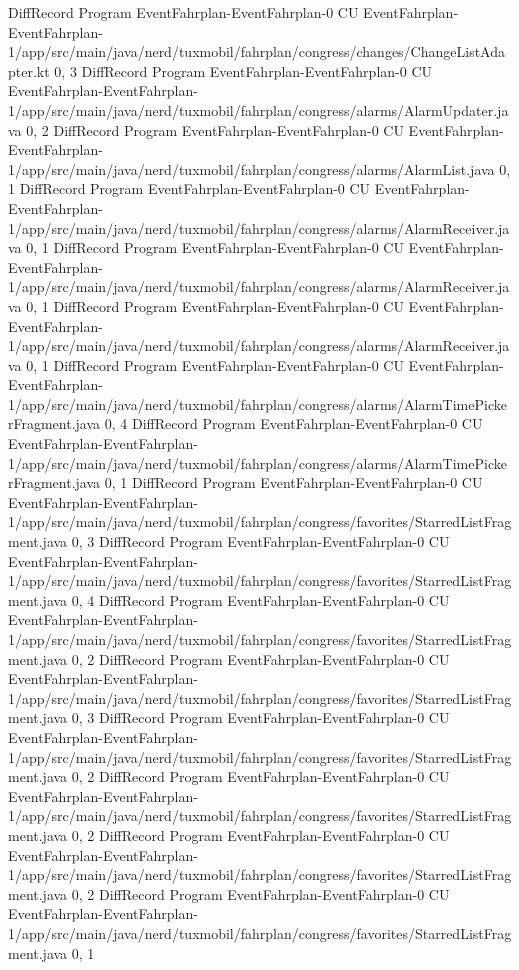 DiffRecord Program EventFahrplan-EventFahrplan-0 CU EventFahrplan-EventFahrplan-1/app/src/main/java/nerd/tuxmobil/fahrplan/congress/changes/ChangeListAdapter.kt  {0, 3}
DiffRecord Program EventFahrplan-EventFahrplan-0 CU EventFahrplan-EventFahrplan-1/app/src/main/java/nerd/tuxmobil/fahrplan/congress/alarms/AlarmUpdater.java  {0, 2}
DiffRecord Program EventFahrplan-EventFahrplan-0 CU EventFahrplan-EventFahrplan-1/app/src/main/java/nerd/tuxmobil/fahrplan/congress/alarms/AlarmList.java  {0, 1}
DiffRecord Program EventFahrplan-EventFahrplan-0 CU EventFahrplan-EventFahrplan-1/app/src/main/java/nerd/tuxmobil/fahrplan/congress/alarms/AlarmReceiver.java  {0, 1}
DiffRecord Program EventFahrplan-EventFahrplan-0 CU EventFahrplan-EventFahrplan-1/app/src/main/java/nerd/tuxmobil/fahrplan/congress/alarms/AlarmReceiver.java  {0, 1}
DiffRecord Program EventFahrplan-EventFahrplan-0 CU EventFahrplan-EventFahrplan-1/app/src/main/java/nerd/tuxmobil/fahrplan/congress/alarms/AlarmReceiver.java  {0, 1}
DiffRecord Program EventFahrplan-EventFahrplan-0 CU EventFahrplan-EventFahrplan-1/app/src/main/java/nerd/tuxmobil/fahrplan/congress/alarms/AlarmTimePickerFragment.java  {0, 4}
DiffRecord Program EventFahrplan-EventFahrplan-0 CU EventFahrplan-EventFahrplan-1/app/src/main/java/nerd/tuxmobil/fahrplan/congress/alarms/AlarmTimePickerFragment.java  {0, 1}
DiffRecord Program EventFahrplan-EventFahrplan-0 CU EventFahrplan-EventFahrplan-1/app/src/main/java/nerd/tuxmobil/fahrplan/congress/favorites/StarredListFragment.java  {0, 3}
DiffRecord Program EventFahrplan-EventFahrplan-0 CU EventFahrplan-EventFahrplan-1/app/src/main/java/nerd/tuxmobil/fahrplan/congress/favorites/StarredListFragment.java  {0, 4}
DiffRecord Program EventFahrplan-EventFahrplan-0 CU EventFahrplan-EventFahrplan-1/app/src/main/java/nerd/tuxmobil/fahrplan/congress/favorites/StarredListFragment.java  {0, 2}
DiffRecord Program EventFahrplan-EventFahrplan-0 CU EventFahrplan-EventFahrplan-1/app/src/main/java/nerd/tuxmobil/fahrplan/congress/favorites/StarredListFragment.java  {0, 3}
DiffRecord Program EventFahrplan-EventFahrplan-0 CU EventFahrplan-EventFahrplan-1/app/src/main/java/nerd/tuxmobil/fahrplan/congress/favorites/StarredListFragment.java  {0, 2}
DiffRecord Program EventFahrplan-EventFahrplan-0 CU EventFahrplan-EventFahrplan-1/app/src/main/java/nerd/tuxmobil/fahrplan/congress/favorites/StarredListFragment.java  {0, 2}
DiffRecord Program EventFahrplan-EventFahrplan-0 CU EventFahrplan-EventFahrplan-1/app/src/main/java/nerd/tuxmobil/fahrplan/congress/favorites/StarredListFragment.java  {0, 2}
DiffRecord Program EventFahrplan-EventFahrplan-0 CU EventFahrplan-EventFahrplan-1/app/src/main/java/nerd/tuxmobil/fahrplan/congress/favorites/StarredListFragment.java  {0, 1}
